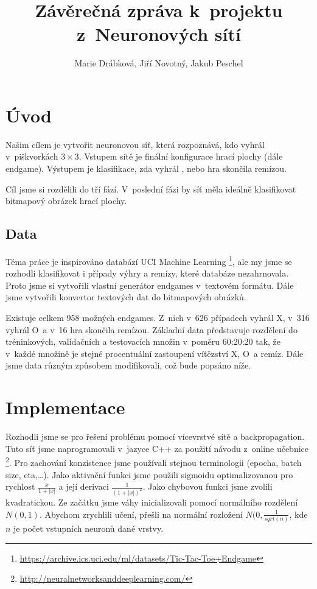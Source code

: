 \documentclass[10pt,a4paper]{article}
\title{Závěrečná zpráva k~projektu z~Neuronových sítí}
\author{Marie Drábková, Jiří Novotný, Jakub Peschel}
\begin{document}
\maketitle

\section*{Úvod}
Našim cílem je vytvořit neuronovou síť, která rozpoznává, kdo vyhrál v~piškvorkách $3\times 3$. Vstupem sítě je finální konfigurace hrací plochy (dále endgame). Výstupem je klasifikace, zda vyhrál  ,  nebo hra skončila remízou. 

Cíl jsme si rozdělili do tří fází. V~poslední fázi by síť měla ideálně klasifikovat bitmapový obrázek hrací plochy.


\subsection*{Data}
Téma práce je inspirováno databází UCI Machine Learning \footnote{\url{https://archive.ics.uci.edu/ml/datasets/Tic-Tac-Toe+Endgame}}, ale my jsme se rozhodli klasifikovat i případy výhry  a remízy, které databáze nezahrnovala. Proto jsme si vytvořili vlastní generátor endgames v~textovém formátu. Dále jsme vytvořili konvertor textových dat do bitmapových obrázků.

Existuje celkem 958 možných endgames. Z~nich v~626 případech vyhrál X, v~316 vyhrál O~a v~16 hra skončila remízou. Základní data představuje rozdělení do tréninkových, validačních a testovacích množin v~poměru 60:20:20 tak, že v~každé množině je stejné procentuální zastoupení vítězství X, O~a remíz. Dále jsme data různým způsobem modifikovali, což bude popsáno níže.

\section*{Implementace}
Rozhodli jsme se pro řešení problému pomocí vícevrstvé sítě a backpropagation. Tuto síť jsme naprogramovali v~jazyce C++ za použití návodu z~online učebnice  \footnote{\url{http://neuralnetworksanddeeplearning.com/}}. Pro zachování konzistence jsme používali stejnou terminologii (epocha, batch size, eta,\dots). Jako aktivační funkci jsme použili sigmoidu optimalizovanou pro rychlost $\frac{x}{1+|x|}$ a její derivaci $\frac{1}{(1+|x|)^2}$. Jako chybovou funkci jsme zvolili kvadratickou. Ze začátku jsme váhy inicializovali pomocí normálního rozdělení $N(0,1)$. Abychom zrychlili učení, přešli na normální rozložení $N(0,\frac{1}{sqrt(n)}$, kde $n$ je počet vstupních neuronů dané vrstvy.
\end{document}
